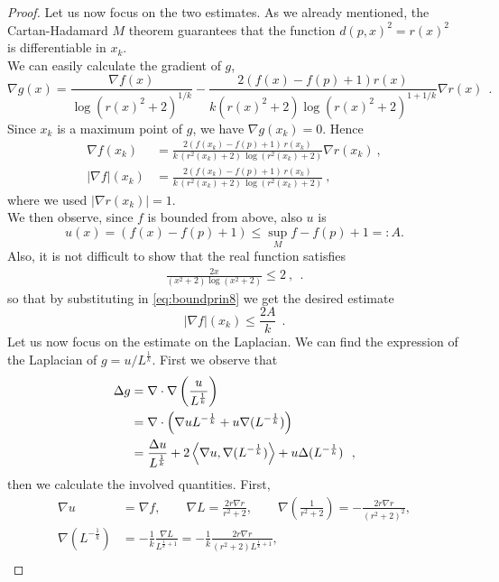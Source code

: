 \documentclass[a4paper,11pt,openright,twoside]{book}
\newcommand{\1}{\mathds{1}}
\theoremstyle{plain}
\theoremstyle{definition}
\theoremstyle{remark}
\begin{document}
\begin{proof}
	Let us now focus on the two estimates. As we already mentioned, the Cartan-Hadamard $M$ theorem guarantees that the function $d(p,x)^2 = r(x)^2$ is differentiable in $x_k$.\\
	We can easily calculate the gradient of $g$,
	\[
	\nabla g(x)
	=
	\frac{\nabla f(x)}{\log(r(x)^2+2)^{1/k}}
	-
	\frac{2(f(x)-f(p)+1)r(x)}{k(r(x)^2+2)\log(r(x)^2+2)^{1+1/k}}\nabla r(x)
	\ \ .\]
	Since $x_k$ is a maximum point of $g$, we have $\nabla g(x_k)=0$. Hence
	\begin{align}
		\nabla f(x_k)
		&=
		\frac{2(f(x_k)-f(p)+1)\,r(x_k)}{k\,(r^2(x_k)+2)\,\log(r^2(x_k)+2)}\nabla r(x_k)\ ,\label{eq:boundprin9}\\
		|\nabla f|(x_k)
		&=
		\frac{2(f(x_k)-f(p)+1)\,r(x_k)}{k\,(r^2(x_k)+2)\,\log(r^2(x_k)+2)}
		\ , \label{eq:boundprin8}
	\end{align}
	where we used $|\nabla r(x_k)|=1$.\\
	We then observe, since $f$ is bounded from above, also $u$ is
	\[ u(x) = ( f(x)-f(p)+1) \leq \sup_M f - f(p) +1  =: A.\]
	Also, it is not difficult to show that the real function satisfies 
	\begin{align}\label{eq:boundprin14}
		\frac{2x}{ (x^2+2) \log(x^2+2)}\leq 2\ ,
	\ \ .
	\end{align}
	 so that by substituting in \eqref{eq:boundprin8} we get the desired estimate 
	\[|\nabla f| (x_k) \leq \frac{2A}{k}\ \ .\] 
	Let us now focus on the estimate on the Laplacian. We can find the expression of the Laplacian of $g=u /L^{\frac{1}{k}}$. First we observe that
	\begin{align}\label{eq:boundprindeltag1}
		\Delta g &= \nabla\cdot \nabla \left( \frac{u}{L^{\frac{1}{k}}} \right)\notag \\
				 &= \nabla \cdot \left( \nabla u L^{-\frac{1}{k}} + u \nabla (L^{-\frac{1}{k}})  \right)   \notag\\
				 &=\frac{\Delta u}{ L^{\frac{1}{k}}} +2 \left< \nabla u, \nabla (L^{-\frac{1}{k}})  \right> + u \Delta(L^{-\frac{1}{k}})
	\ \ ,
	\end{align}
	then we calculate the involved quantities.
	First,	
	\begin{align*}
		\nabla u&= \nabla f,\qquad
		\nabla L = \frac{2r\nabla r}{r^2 +2},\qquad
		\nabla \left( \frac{1}{r^2+2} \right) = -\frac{2r\nabla r}{(r^2+2)^2},\\
		\nabla \left( L^{-\frac{1}{k}} \right)  &= -\frac{1}{k} \frac{\nabla L }{L^{\frac{1}{k}+1}}
		= -\frac{1}{k} \frac{2r\nabla r}{(r^2+2)L^{\frac{1}{k}+1}},\\

\end{align*}
\end{proof}
\end{document}
